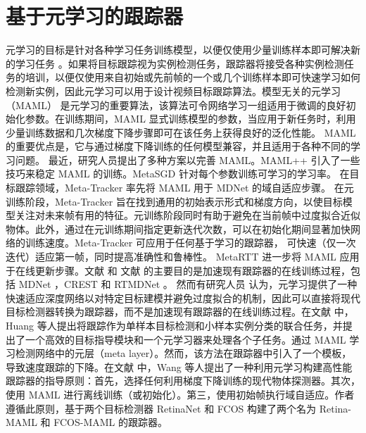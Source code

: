 \section{基于元学习的跟踪器} %
元学习的目标是针对各种学习任务训练模型，以便仅使用少量训练样本即可解决新的学习任务 \cite{MAML}。如果将目标跟踪视为实例检测任务，跟踪器将接受各种实例检测任务的培训，以便仅使用来自初始或先前帧的一个或几个训练样本即可快速学习如何检测新实例，因此元学习可以用于设计视频目标跟踪算法。模型无关的元学习（MAML）\cite{MAML} 是元学习的重要算法，该算法可令网络学习一组适用于微调的良好初始化参数。在训练期间，MAML 显式训练模型的参数，当应用于新任务时，利用少量训练数据和几次梯度下降步骤即可在该任务上获得良好的泛化性能。 MAML 的重要优点是，它与通过梯度下降训练的任何模型兼容，并且适用于各种不同的学习问题。
最近，研究人员提出了多种方案以完善 MAML。MAML++ \cite{MAML++} 引入了一些技巧来稳定 MAML 的训练。MetaSGD \cite{MetaSGD} 针对每个参数训练可学习的学习率。
在目标跟踪领域，Meta-Tracker \cite{MetaTracker} 率先将 MAML 用于 MDNet \cite{MDNet} 的域自适应步骤。
在元训练阶段，Meta-Tracker 旨在找到通用的初始表示形式和梯度方向，以使目标模型关注对未来帧有用的特征。元训练阶段同时有助于避免在当前帧中过度拟合近似物体。此外，通过在元训练期间指定更新迭代次数，可以在初始化期间显著加快网络的训练速度。Meta-Tracker 可应用于任何基于学习的跟踪器，
可快速（仅一次迭代）适应第一帧，同时提高准确性和鲁棒性。
MetaRTT \cite{MetaRTT} 进一步将 MAML 应用于在线更新步骤。文献 \cite{MetaTracker} 和 文献 \cite{MetaRTT} 的主要目的是加速现有跟踪器的在线训练过程，包括 MDNet \cite{MDNet}，CREST \cite{CREST} 和 RTMDNet \cite{RTMDNet}。
然而有研究人员 \cite{huang2019bridging} 认为，元学习提供了一种快速适应深度网络以对特定目标建模并避免过度拟合的机制，因此可以直接将现代目标检测器转换为跟踪器，而不是加速现有跟踪器的在线训练过程。在文献 \cite{huang2019bridging} 中，Huang 等人提出将跟踪作为单样本目标检测和小样本实例分类的联合任务，并提出了一个高效的目标指导模块和一个元学习器来处理各个子任务。通过 MAML 学习检测网络中的元层（meta layer）。然而，该方法在跟踪器中引入了一个模板，导致速度跟踪的下降。在文献 \cite{TrackingBy} 中，Wang 等人提出了一种利用元学习构建高性能跟踪器的指导原则：首先，选择任何利用梯度下降训练的现代物体探测器。其次，使用 MAML 进行离线训练（或初始化）。第三，使用初始帧执行域自适应。作者遵循此原则，基于两个目标检测器 RetinaNet \cite{focal} 和 FCOS \cite{tian2019fcos} 构建了两个名为 Retina-MAML 和 FCOS-MAML 的跟踪器。
